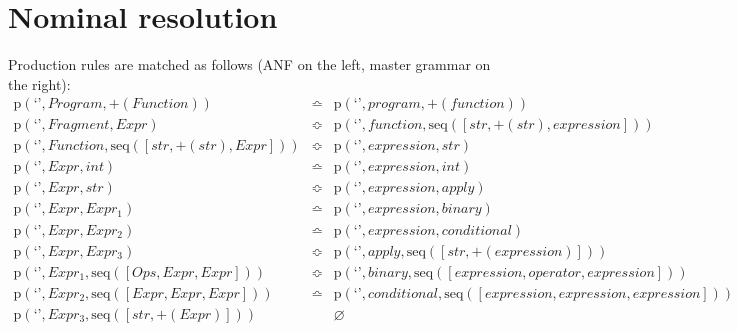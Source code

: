 \section{Nominal resolution}

Production rules are matched as follows (ANF on the left, master grammar on the right):
\begin{eqnarray*}
\mathrm{p}\left(\text{`'},\mathit{Program},{+}\left(\mathit{Function}\right)\right) & \bumpeq & \mathrm{p}\left(\text{`'},\mathit{program},{+}\left(\mathit{function}\right)\right) \\
\mathrm{p}\left(\text{`'},\mathit{Fragment},\mathit{Expr}\right) & \Bumpeq & \mathrm{p}\left(\text{`'},\mathit{function},\mathrm{seq}\left(\left[str, {+}\left(str\right), \mathit{expression}\right]\right)\right) \\
\mathrm{p}\left(\text{`'},\mathit{Function},\mathrm{seq}\left(\left[str, {+}\left(str\right), \mathit{Expr}\right]\right)\right) & \Bumpeq & \mathrm{p}\left(\text{`'},\mathit{expression},str\right) \\
\mathrm{p}\left(\text{`'},\mathit{Expr},int\right) & \bumpeq & \mathrm{p}\left(\text{`'},\mathit{expression},int\right) \\
\mathrm{p}\left(\text{`'},\mathit{Expr},str\right) & \Bumpeq & \mathrm{p}\left(\text{`'},\mathit{expression},\mathit{apply}\right) \\
\mathrm{p}\left(\text{`'},\mathit{Expr},\mathit{Expr_1}\right) & \bumpeq & \mathrm{p}\left(\text{`'},\mathit{expression},\mathit{binary}\right) \\
\mathrm{p}\left(\text{`'},\mathit{Expr},\mathit{Expr_2}\right) & \bumpeq & \mathrm{p}\left(\text{`'},\mathit{expression},\mathit{conditional}\right) \\
\mathrm{p}\left(\text{`'},\mathit{Expr},\mathit{Expr_3}\right) & \Bumpeq & \mathrm{p}\left(\text{`'},\mathit{apply},\mathrm{seq}\left(\left[str, {+}\left(\mathit{expression}\right)\right]\right)\right) \\
\mathrm{p}\left(\text{`'},\mathit{Expr_1},\mathrm{seq}\left(\left[\mathit{Ops}, \mathit{Expr}, \mathit{Expr}\right]\right)\right) & \Bumpeq & \mathrm{p}\left(\text{`'},\mathit{binary},\mathrm{seq}\left(\left[\mathit{expression}, \mathit{operator}, \mathit{expression}\right]\right)\right) \\
\mathrm{p}\left(\text{`'},\mathit{Expr_2},\mathrm{seq}\left(\left[\mathit{Expr}, \mathit{Expr}, \mathit{Expr}\right]\right)\right) & \bumpeq & \mathrm{p}\left(\text{`'},\mathit{conditional},\mathrm{seq}\left(\left[\mathit{expression}, \mathit{expression}, \mathit{expression}\right]\right)\right) \\
\mathrm{p}\left(\text{`'},\mathit{Expr_3},\mathrm{seq}\left(\left[str, {+}\left(\mathit{Expr}\right)\right]\right)\right) &  & \varnothing \\
\end{eqnarray*}
